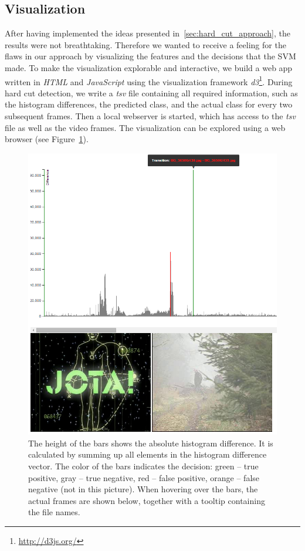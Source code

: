 \subsection{Visualization}
\label{sec:hard_cut_visualization}

After having implemented the ideas presented in~\ref{sec:hard_cut_approach}, the results were not breathtaking.
Therefore we wanted to receive a feeling for the flaws in our approach by visualizing the features and the decisions that the SVM made.
To make the visualization explorable and interactive, we build a web app written in \emph{HTML} and \emph{JavaScript} using the visualization framework \emph{d3}\footnote{\url{http://d3js.org/}}.
During hard cut detection, we write a \emph{tsv} file containing all required information, such as the histogram differences, the predicted class, and the actual class for every two subsequent frames.
Then a local webserver is started, which has access to the \emph{tsv} file as well as the video frames.
The visualization can be explored using a web browser (see Figure~\ref{fig:hard_cut_visualization}).

\begin{figure}[ht]
	\centering
	\includegraphics[scale=.5]{images/hard_cut_visualization.png}
	\caption{The height of the bars shows the absolute histogram difference.
    It is calculated by summing up all elements in the histogram difference vector.
    The color of the bars indicates the decision: green -- true positive, gray -- true negative, red -- false positive, orange -- false negative (not in this picture).
    When hovering over the bars, the actual frames are shown below, together with a tooltip containing the file names.}
	\label{fig:hard_cut_visualization}
\end{figure}

